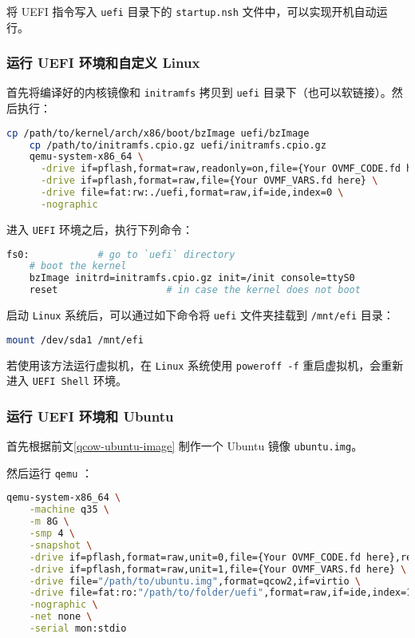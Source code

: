 \begin{remark}
    将 UEFI 指令写入 \texttt{uefi} 目录下的 \texttt{startup.nsh} 文件中，可以实现开机自动运行。
\end{remark}


\subsubsection{运行 UEFI 环境和自定义 Linux}

首先将编译好的内核镜像和 \texttt{initramfs} 拷贝到 \texttt{uefi} 目录下（也可以软链接）。然后执行：

\begin{lstlisting}[language=bash]
    cp /path/to/kernel/arch/x86/boot/bzImage uefi/bzImage
    cp /path/to/initramfs.cpio.gz uefi/initramfs.cpio.gz
    qemu-system-x86_64 \
      -drive if=pflash,format=raw,readonly=on,file={Your OVMF_CODE.fd here} \
      -drive if=pflash,format=raw,file={Your OVMF_VARS.fd here} \
      -drive file=fat:rw:./uefi,format=raw,if=ide,index=0 \
      -nographic
\end{lstlisting}

进入 \texttt{UEFI} 环境之后，执行下列命令：

\begin{lstlisting}[language=bash]
    fs0:            # go to `uefi` directory
    # boot the kernel
    bzImage initrd=initramfs.cpio.gz init=/init console=ttyS0
    reset                   # in case the kernel does not boot
\end{lstlisting}

启动 \texttt{Linux} 系统后，可以通过如下命令将 \texttt{uefi} 文件夹挂载到 \texttt{/mnt/efi} 目录：

\begin{lstlisting}[language=bash]
    mount /dev/sda1 /mnt/efi
\end{lstlisting}

若使用该方法运行虚拟机，在 \texttt{Linux} 系统使用 \texttt{poweroff -f} 重启虚拟机，会重新进入 \texttt{UEFI Shell} 环境。

\subsubsection{运行 UEFI 环境和 Ubuntu}

首先根据前文\ref{qcow-ubuntu-image} 制作一个 Ubuntu 镜像 \texttt{ubuntu.img}。

然后运行 \texttt{qemu} ：

\begin{lstlisting}[language=bash]
    qemu-system-x86_64 \
    -machine q35 \
    -m 8G \
    -smp 4 \
    -snapshot \
    -drive if=pflash,format=raw,unit=0,file={Your OVMF_CODE.fd here},readonly=on \
    -drive if=pflash,format=raw,unit=1,file={Your OVMF_VARS.fd here} \
    -drive file="/path/to/ubuntu.img",format=qcow2,if=virtio \
    -drive file=fat:ro:"/path/to/folder/uefi",format=raw,if=ide,index=1 \
    -nographic \
    -net none \
    -serial mon:stdio
\end{lstlisting}

